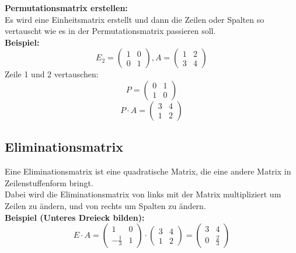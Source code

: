 \documentclass[12pt,a4paper]{article}
\begin{document}
\textbf{Permutationsmatrix erstellen:} \\
Es wird eine Einheitsmatrix erstellt und dann die Zeilen oder Spalten so vertauscht wie es in der Permutationsmatrix passieren soll. \\
\textbf{Beispiel:}
\[
E_2 =
\begin{pmatrix}
1 & 0 \\
0 & 1
\end{pmatrix}
,A =
\begin{pmatrix}
    1 & 2 \\
    3 & 4
\end{pmatrix}
\]
Zeile 1 und 2 vertauschen:
\[
P =
\begin{pmatrix}
0 & 1 \\
1 & 0
\end{pmatrix}
\]
\[
P \cdot A = 
\begin{pmatrix}
    3 & 4 \\
    1 & 2
\end{pmatrix}
\]


\subsection{Eliminationsmatrix}
Eine Eliminationsmatrix ist eine quadratische Matrix, die eine andere Matrix in Zeilenstuffenform bringt. \\
Dabei wird die Eliminationsmatrix von links mit der Matrix multipliziert um Zeilen zu ändern, und von rechts um Spalten zu ändern. \\
\textbf{Beispiel (Unteres Dreieck bilden):}
\[
E \cdot A
=
\begin{pmatrix}
1 & 0 \\
-\frac{1}{3} & 1
\end{pmatrix}
\cdot
\begin{pmatrix}
3 & 4 \\
1 & 2
\end{pmatrix}
=
\begin{pmatrix}
3 & 4 \\
0 & \frac{2}{3}
\end{pmatrix}
\]
\end{document}
